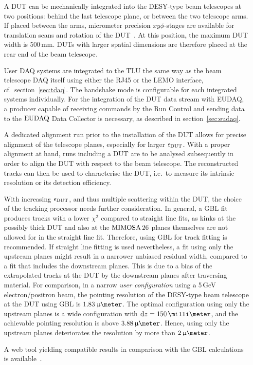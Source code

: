 A DUT can be mechanically integrated into the DESY-type beam telescopes at two positions: behind the last telescope plane, or between the two telescope arms.
If placed between the arms, micrometer precision $xy\phi$-stages are available for translation scans and rotation of the DUT~\cite{Mimosa-twiki}.
At this position, the maximum DUT width is 500\,mm.
DUTs with larger spatial dimensions are therefore placed at the rear end of the beam telescope. 

User DAQ systems are integrated to the TLU the same way as the beam telescope DAQ itself using either the RJ45 or the LEMO interface, cf.~section~\ref{sec:tdaq}.
The handshake mode is configurable for each integrated systems individually. 
For the integration of the DUT data stream with EUDAQ, a producer capable of receiving commands by the Run Control and sending data to the $\textrm{EUDAQ}$ Data Collector is necessary,
 as described in section~\ref{sec:eudaq}.

A dedicated alignment run prior to the installation of the DUT allows for precise alignment of the telescope planes, especially for larger $\mathnormal{\epsilon_{\textrm{DUT}}}$. 
With a proper alignment at hand, runs including a DUT are to be analysed subsequently in order to align the DUT with respect to the beam telescope. 
The reconstructed tracks can then be used to characterise the DUT, i.e.~to measure its intrinsic resolution or its detection efficiency. 

With increasing $\mathnormal{\epsilon_{\textrm{DUT}}}$, and thus multiple scattering within the DUT, the choice of the tracking processor needs further consideration. 
In general, a GBL fit produces tracks with a lower $\chi^2$ compared to straight line fits,
 as kinks at the possibly thick DUT and also at the $\textrm{MIMOSA\,26}$ planes themselves are not allowed for in the straight line fit.
Therefore, using GBL for track fitting is recommended. 
If straight line fitting is used nevertheless, a fit using only the upstream planes might result in a narrower unbiased residual width, compared to a fit that includes the downstream planes. 
This is due to a bias of the extrapolated tracks at the DUT by the downstream planes after traversing material. 
For comparison, in a narrow \textit{user configuration} using a 5\,GeV electron/positron beam, the pointing resolution of the DESY-type beam telescope at the DUT using GBL is $1.83\,\upmu\meter$. 
The optimal configuration using only the upstream planes is a wide configuration with $\dz = 150\,\milli\meter$,
 and the achievable pointing resolution is above $3.88\,\upmu\meter$. 
Hence, using only the upstream planes deteriorates the resolution by more than $2\,\upmu\meter$.

A web tool yielding compatible results in comparison with the GBL calculations is available~\cite{webtool}.